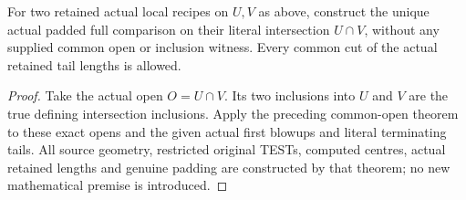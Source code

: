 \begin{corollary}
\label{hir:sharp-actual-curve-literal-intersection-terminal-recipes}
\leanok
For two retained actual local recipes on $U,V$ as above, construct the unique
actual padded full comparison on their literal intersection $U\cap V$,
without any supplied common open or inclusion witness. Every common cut of
the actual retained tail lengths is allowed.
\end{corollary}
\begin{proof}
Take the actual open $O=U\cap V$. Its two inclusions into $U$ and $V$ are the
true defining intersection inclusions. Apply the preceding common-open
theorem to these exact opens and the given actual first blowups and literal
terminating tails. All source geometry, restricted original TESTs, computed
centres, actual retained lengths and genuine padding are constructed by that
theorem; no new mathematical premise is introduced.
\end{proof}
